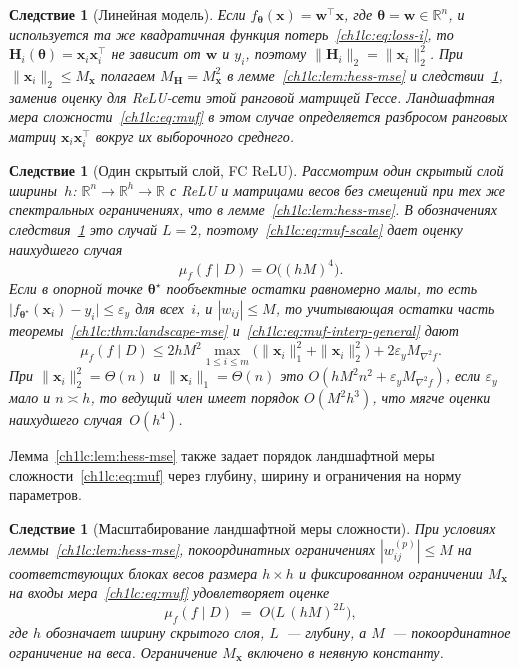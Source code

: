 \documentclass{dissert}
\newtheorem{corollary}[theorem]{Следствие}
\begin{document}
\begin{corollary}[Линейная модель]\label{ch1lc:cor:linear}
Если $f_{\boldsymbol{\theta}}(\mathbf{x})=\mathbf{w}^{\top}\mathbf{x}$, где $\boldsymbol{\theta}=\mathbf{w}\in\mathbb{R}^{n}$, и используется та же квадратичная функция потерь~\eqref{ch1lc:eq:loss-i}, то
$\mathbf{H}_i(\boldsymbol{\theta})=\mathbf{x}_i\mathbf{x}_i^{\top}$ не зависит от $\mathbf{w}$ и $y_i$, поэтому
$\|\mathbf{H}_i\|_2=\|\mathbf{x}_i\|_2^2$.
При $\|\mathbf{x}_i\|_2\le M_{\mathbf{x}}$ полагаем $M_{\mathbf{H}}=M_{\mathbf{x}}^2$ в лемме~\ref{ch1lc:lem:hess-mse} и следствии~\ref{ch1lc:cor:muf}, заменив оценку для ReLU-сети этой ранговой матрицей Гессе.
Ландшафтная мера сложности~\eqref{ch1lc:eq:muf} в этом случае определяется разбросом ранговых матриц $\mathbf{x}_i\mathbf{x}_i^{\top}$ вокруг их выборочного среднего.
\end{corollary}

\begin{corollary}[Один скрытый слой, FC ReLU]\label{ch1lc:cor:shallow}
Рассмотрим один скрытый слой ширины~$h$: $\mathbb{R}^{n}\to\mathbb{R}^{h}\to\mathbb{R}$ с ReLU и матрицами весов без смещений при тех же спектральных ограничениях, что в лемме~\ref{ch1lc:lem:hess-mse}.
В обозначениях следствия~\ref{ch1lc:cor:muf} это случай $L=2$, поэтому~\eqref{ch1lc:eq:muf-scale} дает оценку наихудшего случая
\[
    \mu_f(f\mid D)=O\!\bigl((hM)^{4}\bigr).
\]
Если в опорной точке $\boldsymbol{\theta}^\star$ пообъектные остатки равномерно малы, то есть $\bigl|f_{\boldsymbol{\theta}^\star}(\mathbf{x}_i)-y_i\bigr|\le\varepsilon_y$ для всех~$i$, и $|w_{ij}|\le M$, то учитывающая остатки часть теоремы~\ref{ch1lc:thm:landscape-mse} и~\eqref{ch1lc:eq:muf-interp-general} дают
\[
    \mu_f(f\mid D)
    \le
    2hM^{2}\max_{1\le i\le m}\bigl(\|\mathbf{x}_i\|_{1}^{2}+\|\mathbf{x}_i\|_{2}^{2}\bigr)
    +
    2\varepsilon_y M_{\nabla^2 f}.
\]
При $\|\mathbf{x}_i\|_{2}^{2}=\Theta(n)$ и $\|\mathbf{x}_i\|_{1}=\Theta(n)$ это $O(hM^{2}n^{2}+\varepsilon_y M_{\nabla^2 f})$, если $\varepsilon_y$ мало и $n\asymp h$, то ведущий член имеет порядок $O(M^{2}h^{3})$, что мягче оценки наихудшего случая~$O(h^{4})$.
\end{corollary}

Лемма~\ref{ch1lc:lem:hess-mse} также задает порядок ландшафтной меры сложности~\eqref{ch1lc:eq:muf} через глубину, ширину и ограничения на норму параметров.

\begin{corollary}[Масштабирование ландшафтной меры сложности]\label{ch1lc:cor:muf}
При условиях леммы~\ref{ch1lc:lem:hess-mse}, покоординатных ограничениях $|w_{ij}^{(p)}|\le M$ на соответствующих блоках весов размера $h\times h$ и фиксированном ограничении $M_{\mathbf{x}}$ на входы мера~\eqref{ch1lc:eq:muf} удовлетворяет оценке
\begin{equation}\label{ch1lc:eq:muf-scale}
  \mu_f(f\mid D) \;=\; O\!\bigl(L\,(hM)^{2L}\bigr),
\end{equation}
где $h$ обозначает ширину скрытого слоя, $L$~--- глубину, а $M$~--- покоординатное ограничение на веса. Ограничение $M_{\mathbf{x}}$ включено в неявную константу.
\end{corollary}
\end{document}
